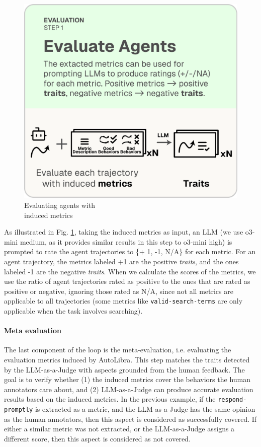 \begin{figure}
	\includegraphics[width=\linewidth]{figs/autolibra_step_3.pdf}
	\vspace{-10pt}
	\caption{Evaluating agents with \\ induced metrics}
	\label{fig:llm_as_a_judge}
\end{figure}
As illustrated in Fig. \ref{fig:llm_as_a_judge}, taking the induced metrics as
input, an LLM (we use o3-mini medium, as it provides similar results in this step
to o3-mini high) is prompted to rate the agent trajectories to \{+ 1, -1, N/A\} for
each metric. For an agent trajectory, the metrics labeled +1 are the positive
\emph{traits}, and the ones labeled -1 are the negative \emph{traits}. When we calculate
the scores of the metrics, we use the ratio of agent trajectories rated as
positive to the ones that are rated as positive or negative, ignoring those rated
as N/A, since not all metrics are applicable to all trajectories (some metrics like
\texttt{valid-search-terms} are only applicable when the task involves searching).

\paragraph{Meta evaluation}
The last component of the loop is the meta-evaluation, i.e. evaluating the
evaluation metrics induced by AutoLibra. This step matches the traits detected by
the LLM-as-a-Judge with aspects grounded from the human feedback. The goal is to
verify whether (1) the induced metrics cover the behaviors the human annotators
care about, and (2) LLM-as-a-Judge can produce accurate evaluation results based
on the induced metrics. In the previous example, if the \texttt{respond-promptly}
is extracted as a metric, and the LLM-as-a-Judge has the same opinion as the human
annotators, then this aspect is considered as successfully covered. If either a similar
metric was not extracted, or the LLM-as-a-Judge assigns a different score, then this
aspect is considered as not covered.

